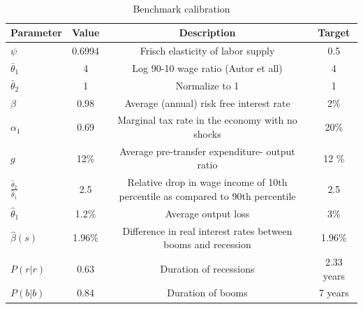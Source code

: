 \documentclass[thmsb,11pt]{article}
\begin{document}
\smallskip \ \pagebreak

\smallskip



\newpage
\begin{table}[htp]
\begin{tabular}{|l|c|c|c|}
\hline
Parameter & Value & Description &Target   \\ \hline
$\psi$ & 0.6994 &Frisch elasticity of labor supply & 0.5   \\
$\bar{\theta}_1 $ & 4& Log 90-10 wage ratio (Autor et all) & 4   \\
$\bar{\theta}_2 $ & 1 &Normalize to 1 & 1  \\
$\beta$ & 0.98  &Average (annual) risk free interest rate & 2\%   \\
$\alpha_1$ & 0.69 & Marginal tax rate in the economy with no shocks & 20\% \\
$g$ & 12\%&Average pre-transfer expenditure- output ratio & 12 \% \\
$\frac{\hat {\theta}_2}{\hat {\theta}_1}$ & 2.5 & Relative drop in wage income of 10th
percentile as compared to 90th percentile & 2.5\\
$\hat{\theta}_1$ & 1.2\% & Average output loss& 3\% \\
$\hat{\beta}(s)$ & 1.96\%& Difference in real interest rates between booms and recession& 1.96\% \\
$P(r|r)$ & 0.63&Duration of recessions & 2.33 years \\
$P(b|b)$ & 0.84 &Duration of booms &7 years \\ \hline
\end{tabular}
\caption{Benchmark calibration}
\label{tab:Parameters}
\end{table}
\end{document}
